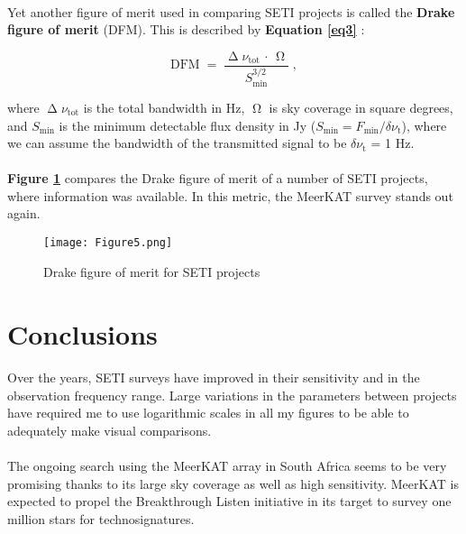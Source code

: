 \documentclass{article}
\begin{document}
\paragraph{}
Yet another figure of merit used in comparing SETI projects is called the \textbf{Drake figure of merit} (DFM). This is described by \textbf{Equation \ref{eq3}} \citep{Price_2020}:

\begin{equation}
\textrm{DFM} \; = \; \frac{\upDelta \nu_{\textrm{tot}} \, \cdot \, \upOmega}{S_{\textrm{min}}^{3/2}} \; ,
\label{eq3}
\end{equation}

where $\upDelta \nu_{\textrm{tot}}$ is the total bandwidth in Hz, $\upOmega$ is sky coverage in square degrees, and $S_{\textrm{min}}$ is the minimum detectable flux density in Jy ($S_{\textrm{min}} = F_{\textrm{min}} / \delta \nu_{\textrm{t}}$), where we can assume the bandwidth of the transmitted signal to be $\delta \nu_{\textrm{t}}$ = 1 Hz.

\paragraph{}
\textbf{Figure \ref{fig6}} compares the Drake figure of merit of a number of SETI projects, where information was available. In this metric, the MeerKAT survey stands out again.

\begin{figure}[H]
\begin{center}
\texttt{[image: Figure5.png]}
\caption{Drake figure of merit for SETI projects \textbf{\label{fig6}}}
\end{center}
\end{figure}


\section{Conclusions}

\paragraph{}
Over the years, SETI surveys have improved in their sensitivity and in the observation frequency range. Large variations in the parameters between projects have required me to use logarithmic scales in all my figures to be able to adequately make visual comparisons.

\paragraph{}
The ongoing search using the MeerKAT array in South Africa seems to be very promising thanks to its large sky coverage as well as high sensitivity. MeerKAT is expected to propel the Breakthrough Listen initiative in its target to survey one million stars for technosignatures.


\end{document}
